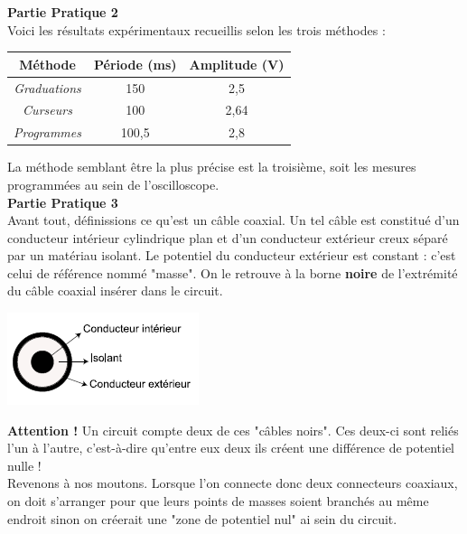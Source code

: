 \documentclass	[11pt, a4paper, openany]{book}
\begin{document}
		\textbf{Partie Pratique 2}\\
		Voici les résultats expérimentaux recueillis selon les trois méthodes : 
		\begin{center}
			\begin{tabular}{|c|c|c|}
				\hline 
				\textbf{Méthode}    & \textbf{Période} (ms) & \textbf{Amplitude} (V) \\ 
				\hline 
				\textit{Graduations} & 150                    & 2,5                    \\ 
				\hline 
				\textit{Curseurs}    & 100                    & 2,64                   \\ 
				\hline 
				\textit{Programmes}  & 100,5                  & 2,8                    \\ 
				\hline 
			\end{tabular}
		\end{center}
		La méthode semblant être la plus précise est la troisième, soit les mesures programmées au sein de l'oscilloscope.\\
		
		\textbf{Partie Pratique 3}\\
		Avant tout, définissions ce qu'est un câble coaxial. Un tel câble est constitué d'un conducteur intérieur cylindrique plan et d'un conducteur extérieur creux séparé par un matériau isolant. Le potentiel du conducteur extérieur est constant : c'est celui de référence nommé "masse". On le retrouve à la borne \textbf{noire} de l'extrémité du câble coaxial insérer dans le circuit.
		\begin{center}
			\includegraphics[scale=0.5]{labo/image18.png}
		\end{center}
		\textbf{Attention !} Un circuit compte deux de ces "câbles noirs". Ces deux-ci sont reliés l'un à l'autre, c'est-à-dire qu'entre eux deux ils créent une différence de potentiel nulle !\\
		
		
		Revenons à nos moutons. Lorsque l'on connecte donc deux connecteurs coaxiaux, on doit s'arranger pour que leurs points de masses soient branchés au même endroit sinon on créerait une "zone de potentiel nul" ai sein du circuit.\\
		
\end{document}
